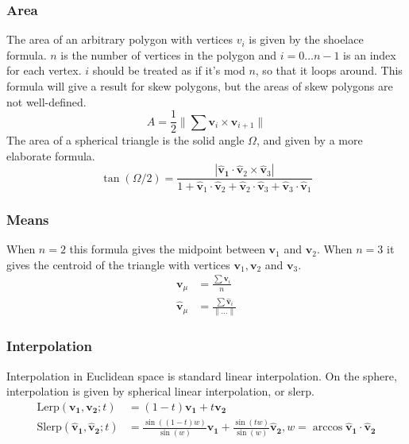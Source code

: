 \documentclass{amsart}[12pt]
\begin{document}
\subsubsection{Area}
The area of an arbitrary polygon with vertices $v_i$ is given by the shoelace
formula. $n$ is the number of vertices in the polygon and
$i = 0 \dots n-1$ is an index for each vertex. $i$ should be treated as if it's
mod $n$, so that it loops around. This formula will give a result for skew
polygons, but the areas of skew polygons are not well-defined.
\begin{equation}
A = \frac{1}{2} \| \sum \mathbf v_i\times \mathbf v_{i+1} \|
\end{equation}
The area of a spherical triangle is the solid angle $\Omega$,
and given by a more elaborate formula. \cite{oosterom}\cite{eriksson}
\begin{equation}
\tan(\Omega/2) = \frac{|\mathbf{\hat{v}_1} \cdot
       \mathbf{\hat{v}}_2 \times \mathbf{\hat{v}}_3|}
       {1+\mathbf{\hat{v}}_1\cdot \mathbf{\hat{v}}_2+\mathbf{\hat{v}}_2
       \cdot \mathbf{\hat{v}}_3+\mathbf{\hat{v}}_3\cdot \mathbf{\hat{v}}_1}
\end{equation}

\subsubsection{Means}
When $n=2$ this formula gives the midpoint between $\mathbf v_1$ and
$\mathbf v_2$. When $n=3$ it gives the centroid of the triangle with
vertices $\mathbf v_1, \mathbf v_2$ and $\mathbf v_3$.
\begin{equation}\begin{split}
\mathbf v_\mu & = \frac{\sum\mathbf v_i}{n} \\
\mathbf{\hat{v}}_\mu & = \frac{\sum\mathbf{\hat{v}}_i}{\|\dots\|}
\end{split}\end{equation}
\subsubsection{Interpolation}
Interpolation in Euclidean space is standard linear interpolation. On the
sphere, interpolation is given by spherical linear interpolation, or slerp.
\begin{equation}\begin{split}
\mathrm{Lerp}(\mathbf{v_1}, \mathbf{v_2}; t) & =
       (1-t) \mathbf{v_1} + t \mathbf{v_2} \\
\mathrm{Slerp}(\mathbf{\hat{v}_1}, \mathbf{\hat{v}_2}; t) & =
       \frac{\sin {((1-t)w)}}{\sin (w)} \mathbf{\hat{v}_1} +
       \frac{\sin (tw)}{\sin (w)} \mathbf{\hat{v}_2},
        w = \arccos \mathbf{\hat{v}_1} \cdot \mathbf{\hat{v}_2}
\end{split}\end{equation}
\end{document}
